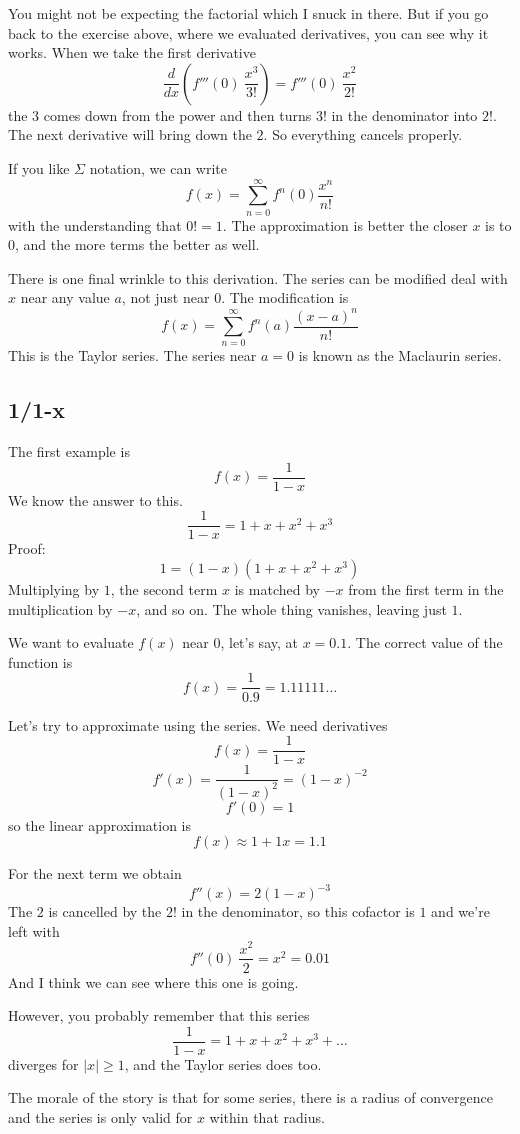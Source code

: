 \documentclass[11pt, oneside]{article}
\begin{document}
You might not be expecting the factorial which I snuck in there.  But if you go back to the exercise above, where we evaluated derivatives, you can see why it works.  When we take the first derivative 
\[ \frac{d}{dx} (f'''(0)\ \frac{x^3}{3!}) =  f'''(0)\ \frac{x^2}{2!}\]
the $3$ comes down from the power and then turns $3!$ in the denominator into $2!$.  The next derivative will bring down the $2$.  So everything cancels properly.  

If you like $\Sigma$ notation, we can write
\[ f(x) = \sum_{n=0}^{\infty} f^n(0) \frac{x^n}{n!} \]
with the understanding that $0! = 1$.  The approximation is better the closer $x$ is to $0$, and the more terms the better as well.  

There is one final wrinkle to this derivation.  The series can be modified deal with $x$ near any value $a$, not just near $0$.  The modification is
\[ f(x) = \sum_{n=0}^{\infty} f^n(a) \frac{(x-a)^n}{n!} \]
This is the Taylor series.  The series near $a=0$ is known as the Maclaurin series.

\subsection*{1/1-x}
The first example is
\[ f(x) = \frac{1}{1-x} \]
We know the answer to this.
\[ \frac{1}{1-x} = 1 + x + x^2 + x^3 \]
Proof:
\[ 1 = (1-x)(1 + x + x^2 + x^3) \]
Multiplying by $1$, the second term $x$ is matched by $-x$ from the first term in the multiplication by $-x$, and so on.  The whole thing vanishes, leaving just $1$.

We want to evaluate $f(x)$ near $0$, let's say, at $x=0.1$.  The correct value of the function is
\[ f(x) = \frac{1}{0.9} = 1.11111 \dots \]

Let's try to approximate using the series.  We need derivatives
\[ f(x) = \frac{1}{1-x} \]
\[ f'(x) = \frac{1}{(1-x)^2} = (1-x)^{-2} \]
\[ f'(0) = 1 \]
so the linear approximation is
\[ f(x) \approx 1 + 1x = 1.1 \]

For the next term we obtain
\[ f''(x) = 2(1-x)^{-3} \]
The $2$ is cancelled by the $2!$ in the denominator, so this cofactor is $1$ and we're left with
\[ f''(0)\ \frac{x^2}{2} = x^2 = 0.01 \]
And I think we can see where this one is going.

However, you probably remember that this series
\[ \frac{1}{1 - x} = 1 + x + x^2 + x^3 + \dots \]
diverges for $|x| \ge 1$, and the Taylor series does too.

The morale of the story is that for some series, there is a radius of convergence and the series is only valid for $x$ within that radius.
\end{document}
